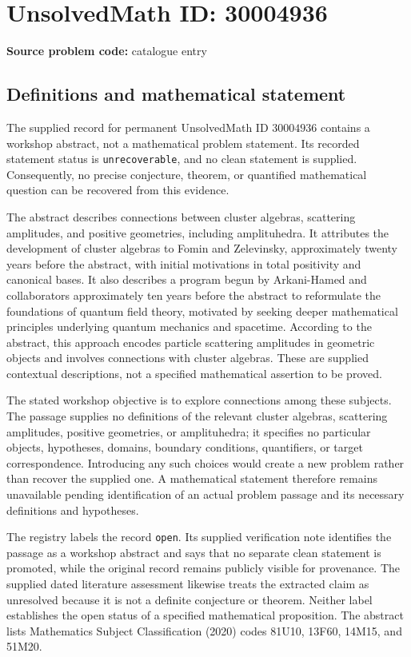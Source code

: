 \documentclass[11pt]{article}
\begin{document}
\section*{UnsolvedMath ID: 30004936}
\textbf{Source problem code:} catalogue entry
\subsection{Definitions and mathematical statement}
The supplied record for permanent UnsolvedMath ID \(30004936\) contains a workshop abstract, not a mathematical problem statement. Its recorded statement status is \texttt{unrecoverable}, and no clean statement is supplied. Consequently, no precise conjecture, theorem, or quantified mathematical question can be recovered from this evidence.

The abstract describes connections between cluster algebras, scattering amplitudes, and positive geometries, including amplituhedra. It attributes the development of cluster algebras to Fomin and Zelevinsky, approximately twenty years before the abstract, with initial motivations in total positivity and canonical bases. It also describes a program begun by Arkani-Hamed and collaborators approximately ten years before the abstract to reformulate the foundations of quantum field theory, motivated by seeking deeper mathematical principles underlying quantum mechanics and spacetime. According to the abstract, this approach encodes particle scattering amplitudes in geometric objects and involves connections with cluster algebras. These are supplied contextual descriptions, not a specified mathematical assertion to be proved.

The stated workshop objective is to explore connections among these subjects. The passage supplies no definitions of the relevant cluster algebras, scattering amplitudes, positive geometries, or amplituhedra; it specifies no particular objects, hypotheses, domains, boundary conditions, quantifiers, or target correspondence. Introducing any such choices would create a new problem rather than recover the supplied one. A mathematical statement therefore remains unavailable pending identification of an actual problem passage and its necessary definitions and hypotheses.

The registry labels the record \texttt{open}. Its supplied verification note identifies the passage as a workshop abstract and says that no separate clean statement is promoted, while the original record remains publicly visible for provenance. The supplied dated literature assessment likewise treats the extracted claim as unresolved because it is not a definite conjecture or theorem. Neither label establishes the open status of a specified mathematical proposition. The abstract lists Mathematics Subject Classification (2020) codes 81U10, 13F60, 14M15, and 51M20.
\end{document}
